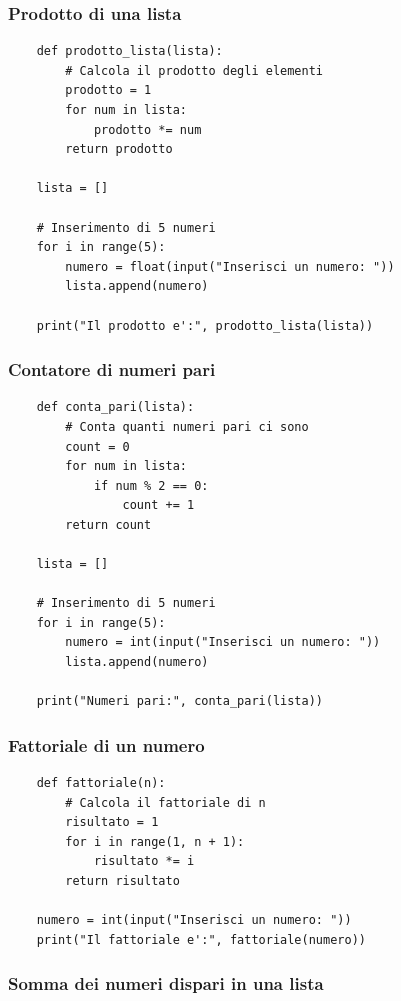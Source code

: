 \documentclass[a4paper,12pt]{article}
\begin{document}
\newpage
\subsubsection{Prodotto di una lista}

\begin{lstlisting}
	def prodotto_lista(lista):
		# Calcola il prodotto degli elementi
		prodotto = 1
		for num in lista:
			prodotto *= num
		return prodotto
	
	lista = []
	
	# Inserimento di 5 numeri
	for i in range(5):
		numero = float(input("Inserisci un numero: "))
		lista.append(numero)
	
	print("Il prodotto e':", prodotto_lista(lista))
\end{lstlisting}

\newpage
\subsubsection{Contatore di numeri pari}

\begin{lstlisting}
	def conta_pari(lista):
		# Conta quanti numeri pari ci sono
		count = 0
		for num in lista:
			if num % 2 == 0:
				count += 1
		return count
	
	lista = []
	
	# Inserimento di 5 numeri
	for i in range(5):
		numero = int(input("Inserisci un numero: "))
		lista.append(numero)
	
	print("Numeri pari:", conta_pari(lista))
\end{lstlisting}

\newpage
\subsubsection{Fattoriale di un numero}

\begin{lstlisting}
	def fattoriale(n):
		# Calcola il fattoriale di n
		risultato = 1
		for i in range(1, n + 1):
			risultato *= i
		return risultato
	
	numero = int(input("Inserisci un numero: "))
	print("Il fattoriale e':", fattoriale(numero))
\end{lstlisting}

\newpage
\subsubsection{Somma dei numeri dispari in una lista}
\end{document}

